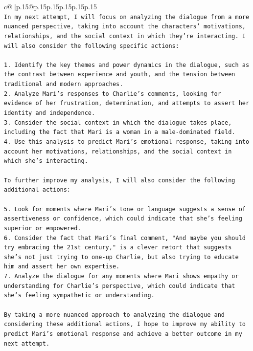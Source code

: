 \documentclass{article}
\begin{document}
{\begin{supertabular}{c@{$\;$}|p{.15\linewidth}@{}p{.15\linewidth}p{.15\linewidth}p{.15\linewidth}p{.15\linewidth}p{.15\linewidth}}
{{{\\ 
\texttt{In my next attempt, I will focus on analyzing the dialogue from a more nuanced perspective, taking into account the characters' motivations, relationships, and the social context in which they're interacting. I will also consider the following specific actions:} \\
\\ 
\texttt{1. Identify the key themes and power dynamics in the dialogue, such as the contrast between experience and youth, and the tension between traditional and modern approaches.} \\
\texttt{2. Analyze Mari's responses to Charlie's comments, looking for evidence of her frustration, determination, and attempts to assert her identity and independence.} \\
\texttt{3. Consider the social context in which the dialogue takes place, including the fact that Mari is a woman in a male{-}dominated field.} \\
\texttt{4. Use this analysis to predict Mari's emotional response, taking into account her motivations, relationships, and the social context in which she's interacting.} \\
\\ 
\texttt{To further improve my analysis, I will also consider the following additional actions:} \\
\\ 
\texttt{5. Look for moments where Mari's tone or language suggests a sense of assertiveness or confidence, which could indicate that she's feeling superior or empowered.} \\
\texttt{6. Consider the fact that Mari's final comment, "And maybe you should try embracing the 21st century," is a clever retort that suggests she's not just trying to one{-}up Charlie, but also trying to educate him and assert her own expertise.} \\
\texttt{7. Analyze the dialogue for any moments where Mari shows empathy or understanding for Charlie's perspective, which could indicate that she's feeling sympathetic or understanding.} \\
\\ 
\texttt{By taking a more nuanced approach to analyzing the dialogue and considering these additional actions, I hope to improve my ability to predict Mari's emotional response and achieve a better outcome in my next attempt.} \\
\\ 
\\ 
}}}
\end{supertabular}}
\end{document}
